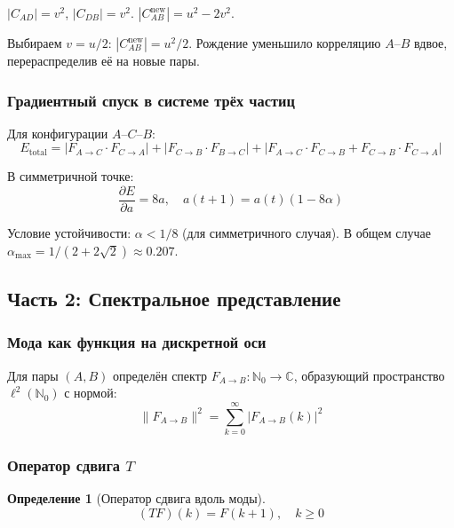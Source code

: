 \documentclass[12pt,a4paper]{article}
\newtheorem{definition}{Определение}[section]
\begin{document}
$|C_{AD}| = v^2$, $|C_{DB}| = v^2$.
$|C_{AB}^{\text{new}}| = u^2 - 2v^2$.

Выбираем $v = u/2$: $|C_{AB}^{\text{new}}| = u^2/2$. Рождение уменьшило корреляцию $A$--$B$ вдвое, перераспределив её на новые пары.

\subsubsection{Градиентный спуск в системе трёх частиц}

Для конфигурации $A$--$C$--$B$:
\begin{equation}
    E_{\text{total}} = |F_{A \to C} \cdot F_{C \to A}| + |F_{C \to B} \cdot F_{B \to C}| + |F_{A \to C} \cdot F_{C \to B} + F_{C \to B} \cdot F_{C \to A}|
\end{equation}

В симметричной точке:
\begin{equation}
    \frac{\partial E}{\partial a} = 8a, \quad a(t+1) = a(t)(1 - 8\alpha)
\end{equation}

Условие устойчивости: $\alpha < 1/8$ (для симметричного случая). В общем случае $\alpha_{\max} = 1 / (2 + 2\sqrt{2}) \approx 0.207$.

\subsection{Часть 2: Спектральное представление}

\subsubsection{Мода как функция на дискретной оси}

Для пары $(A, B)$ определён спектр $F_{A \to B} : \mathbb{N}_0 \to \mathbb{C}$, образующий пространство $\ell^2(\mathbb{N}_0)$ с нормой:
\begin{equation}
    \|F_{A \to B}\|^2 = \sum_{k=0}^{\infty} |F_{A \to B}(k)|^2
\end{equation}

\subsubsection{Оператор сдвига $T$}

\begin{definition}[Оператор сдвига вдоль моды]
\begin{equation}
    (T F)(k) = F(k+1), \quad k \geq 0
\end{equation}
\end{definition}
\end{document}
